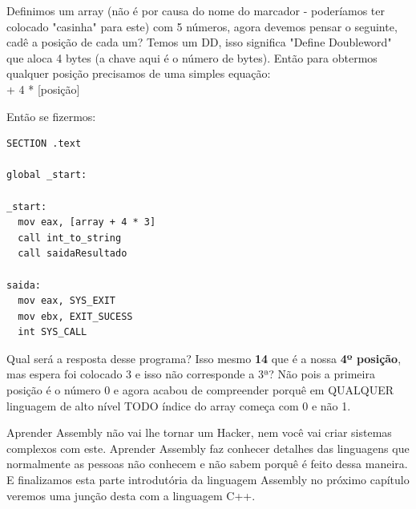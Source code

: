 Definimos um array (não é por causa do nome do marcador - poderíamos ter colocado "casinha" para este) com 5 números, agora devemos pensar o seguinte, cadê a posição de cada um? Temos um DD, isso significa "Define Doubleword" que aloca 4 bytes (a chave aqui é o número de bytes). Então para obtermos qualquer posição precisamos de uma simples equação: \\
{ + 4 * [posição]}

Então se fizermos:
\begin{lstlisting}[]
SECTION .text

global _start:

_start:
  mov eax, [array + 4 * 3]
  call int_to_string
  call saidaResultado

saida:
  mov eax, SYS_EXIT
  mov ebx, EXIT_SUCESS
  int SYS_CALL 	
\end{lstlisting}

Qual será a resposta desse programa? Isso mesmo \textbf{14} que é a nossa \textbf{4º posição}, mas espera foi  colocado 3 e isso não corresponde a 3ª? Não pois a primeira posição é o número 0 e agora acabou de compreender porquê em QUALQUER linguagem de alto nível TODO índice do array começa com 0 e não 1.

Aprender Assembly não vai lhe tornar um Hacker, nem você vai criar sistemas complexos com este. Aprender Assembly faz conhecer detalhes das linguagens que normalmente as pessoas não conhecem e não sabem porquê é feito dessa maneira. E finalizamos esta parte introdutória da linguagem Assembly no próximo capítulo veremos uma junção desta com a linguagem C++.

\clearpage